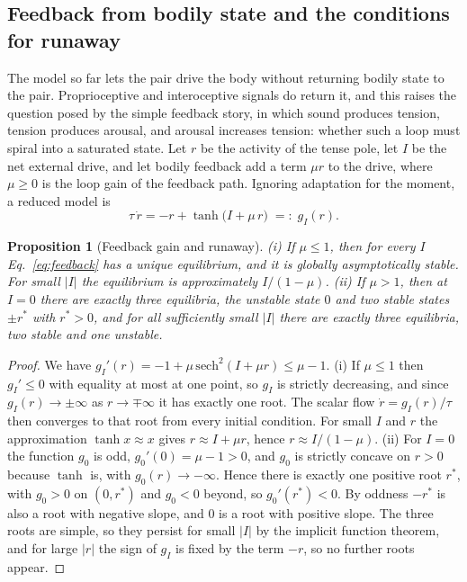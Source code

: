 \documentclass[11pt]{article}
\theoremstyle{plain}
\newtheorem{proposition}{Proposition}
\theoremstyle{definition}
\begin{document}
\subsection{Feedback from bodily state and the conditions for runaway}\label{sec:feedback}

The model so far lets the pair drive the body without returning bodily state to the pair. Proprioceptive and interoceptive signals do return it, and this raises the question posed by the simple feedback story, in which sound produces tension, tension produces arousal, and arousal increases tension: whether such a loop must spiral into a saturated state. Let $r$ be the activity of the tense pole, let $I$ be the net external drive, and let bodily feedback add a term $\mu r$ to the drive, where $\mu\ge 0$ is the loop gain of the feedback path. Ignoring adaptation for the moment, a reduced model is
\begin{equation}
\tau\,\dot r = -r + \tanh\!\big(I+\mu\,r\big) \;=:\; g_I(r).
\label{eq:feedback}
\end{equation}

\begin{proposition}[Feedback gain and runaway]
\label{prop:feedback}
(i) If $\mu\le 1$, then for every $I$ Eq.~\eqref{eq:feedback} has a unique equilibrium, and it is globally asymptotically stable. For small $|I|$ the equilibrium is approximately $I/(1-\mu)$. (ii) If $\mu>1$, then at $I=0$ there are exactly three equilibria, the unstable state $0$ and two stable states $\pm r^{\ast}$ with $r^{\ast}>0$, and for all sufficiently small $|I|$ there are exactly three equilibria, two stable and one unstable.
\end{proposition}

\begin{proof}
We have $g_I'(r)=-1+\mu\,\mathrm{sech}^2(I+\mu r)\le\mu-1$. (i) If $\mu\le 1$ then $g_I'\le 0$ with equality at most at one point, so $g_I$ is strictly decreasing, and since $g_I(r)\to\pm\infty$ as $r\to\mp\infty$ it has exactly one root. The scalar flow $\dot r=g_I(r)/\tau$ then converges to that root from every initial condition. For small $I$ and $r$ the approximation $\tanh x\approx x$ gives $r\approx I+\mu r$, hence $r\approx I/(1-\mu)$. (ii) For $I=0$ the function $g_0$ is odd, $g_0'(0)=\mu-1>0$, and $g_0$ is strictly concave on $r>0$ because $\tanh$ is, with $g_0(r)\to-\infty$. Hence there is exactly one positive root $r^{\ast}$, with $g_0>0$ on $(0,r^{\ast})$ and $g_0<0$ beyond, so $g_0'(r^{\ast})<0$. By oddness $-r^{\ast}$ is also a root with negative slope, and $0$ is a root with positive slope. The three roots are simple, so they persist for small $|I|$ by the implicit function theorem, and for large $|r|$ the sign of $g_I$ is fixed by the term $-r$, so no further roots appear.
\end{proof}
\end{document}
